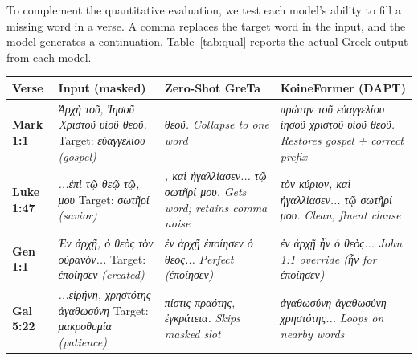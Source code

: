 \documentclass[11pt,letterpaper]{article}
\newcommand{\gk}[1]{{\greekfont\itshape #1}}
\newcommand{\tblhead}{\rowcolor{marine!12}}
\begin{document}
To complement the quantitative evaluation, we test each model's ability to
fill a missing word in a verse.  A comma replaces the target word in the
input, and the model generates a continuation.  Table~\ref{tab:qual} reports
the actual Greek output from each model.

\begin{table}[H]
\centering
\small
\setlength{\tabcolsep}{4pt}
\begin{tabular}{L{1.5cm}L{2.6cm}L{4.25cm}L{4.25cm}}
\toprule
\tblhead\textbf{Verse} & \textbf{Input (masked)} & \textbf{Zero-Shot GreTa} & \textbf{KoineFormer (DAPT)} \\
\midrule
\textbf{Mark 1:1}
& \gk{Ἀρχὴ τοῦ, Ἰησοῦ Χριστοῦ υἱοῦ θεοῦ.}
\newline Target: \gk{εὐαγγελίου} \textit{(gospel)}
& \gk{θεοῦ.}
\newline\textit{Collapse to one word}
& \gk{πρώτην τοῦ εὐαγγελίου ἰησοῦ χριστοῦ υἱοῦ θεοῦ.}
\newline\textit{Restores gospel + correct prefix} \\
\midrule
{}
\textbf{Luke 1:47}
& \gk{...ἐπὶ τῷ θεῷ τῷ, μου}
\newline Target: \gk{σωτῆρί} \textit{(savior)}
& \gk{, καὶ ἠγαλλίασεν... τῷ σωτῆρί μου.}
\newline\textit{Gets word; retains comma noise}
& \gk{τὸν κύριον, καὶ ἠγαλλίασεν... τῷ σωτῆρί μου.}
\newline\textit{Clean, fluent clause} \\
\midrule
\textbf{Gen 1:1}
& \gk{Ἐν ἀρχῇ, ὁ θεὸς τὸν οὐρανὸν...}
\newline Target: \gk{ἐποίησεν} \textit{(created)}
& \gk{ἐν ἀρχῇ ἐποίησεν ὁ θεὸς...}
\newline\textit{Perfect (\gk{ἐποίησεν})}
& \gk{ἐν ἀρχῇ ἦν ὁ θεὸς...}
\newline\textit{John 1:1 override (\gk{ἦν} for \gk{ἐποίησεν})} \\
\midrule
\textbf{Gal 5:22}
& \gk{...εἰρήνη, χρηστότης ἀγαθωσύνη}
\newline Target: \gk{μακροθυμία} \textit{(patience)}
& \gk{πίστις πραότης, ἐγκράτεια.}
\newline\textit{Skips masked slot}
& \gk{ἀγαθωσύνη ἀγαθωσύνη χρηστότης...}
\newline\textit{Loops on nearby words} \\
\bottomrule
\end{tabular}

\end{table}
\end{document}
